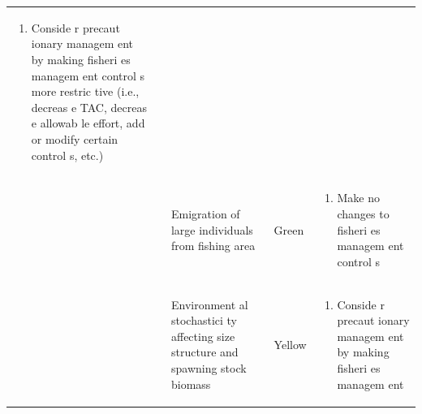\documentclass[]{book}
\providecommand{\tightlist}{%
  \setlength{\itemsep}{0pt}\setlength{\parskip}{0pt}}
\begin{document}
\begin{longtable}[]{@{}lllll@{}}
\begin{minipage}[t]{0.19\columnwidth}
\begin{enumerate}
\def\labelenumi{\arabic{enumi}.}
\setcounter{enumi}{1}
\tightlist
\item
  Conside r precaut ionary managem ent by making fisheri es managem ent
  control s more restric tive (i.e., decreas e TAC, decreas e allowab le
  effort, add or modify certain control s, etc.)
\end{enumerate}\strut
\end{minipage}\tabularnewline
\begin{minipage}[t]{0.19\columnwidth}\raggedright\strut
\strut
\end{minipage} & \begin{minipage}[t]{0.19\columnwidth}\raggedright\strut
\strut
\end{minipage} & \begin{minipage}[t]{0.19\columnwidth}\raggedright\strut
Emigration of large individuals from fishing area\strut
\end{minipage} & \begin{minipage}[t]{0.19\columnwidth}\raggedright\strut
Green\strut
\end{minipage} & \begin{minipage}[t]{0.19\columnwidth}\raggedright\strut
\begin{enumerate}
\def\labelenumi{\arabic{enumi}.}
\tightlist
\item
  Make no changes to fisheri es managem ent control s
\end{enumerate}\strut
\end{minipage}\tabularnewline
\begin{minipage}[t]{0.19\columnwidth}\raggedright\strut
\strut
\end{minipage} & \begin{minipage}[t]{0.19\columnwidth}\raggedright\strut
\strut
\end{minipage} & \begin{minipage}[t]{0.19\columnwidth}\raggedright\strut
Environment al stochastici ty affecting size structure and spawning
stock biomass\strut
\end{minipage} & \begin{minipage}[t]{0.19\columnwidth}\raggedright\strut
Yellow\strut
\end{minipage} & \begin{minipage}[t]{0.19\columnwidth}\raggedright\strut
\begin{enumerate}
\def\labelenumi{\arabic{enumi}.}
\tightlist
\item
  Conside r precaut ionary managem ent by making fisheri es managem ent

\end{enumerate}
\end{minipage}
\end{longtable}
\end{document}
